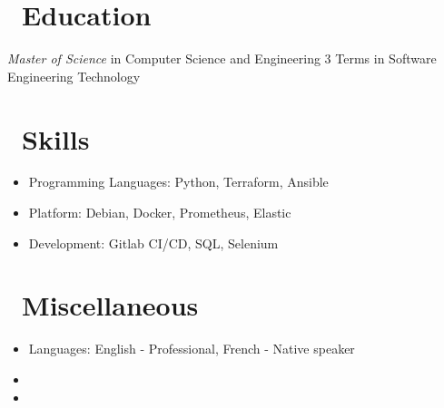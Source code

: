 \documentclass{resume}
\begin{document}
\section{\texorpdfstring{\textbf{}\ Education}{Education}}

\textit{Master of Science} in Computer Science and Engineering
3 Terms in Software Engineering Technology

\section{\texorpdfstring{\textbf{}\ Skills}{Skills}}

\begin{itemize}[parsep=0.5ex]
  \item Programming Languages: Python, Terraform, Ansible
  \item Platform: Debian, Docker, Prometheus, Elastic
  \item Development: Gitlab CI/CD, SQL, Selenium
\end{itemize}

\section{\texorpdfstring{\textbf{}\ Miscellaneous}{Miscellaneous}}

\begin{itemize}[parsep=0.5ex]
  \item Languages: English - Professional, French - Native speaker
  \item {}
  \item {}
\end{itemize}
\end{document}
